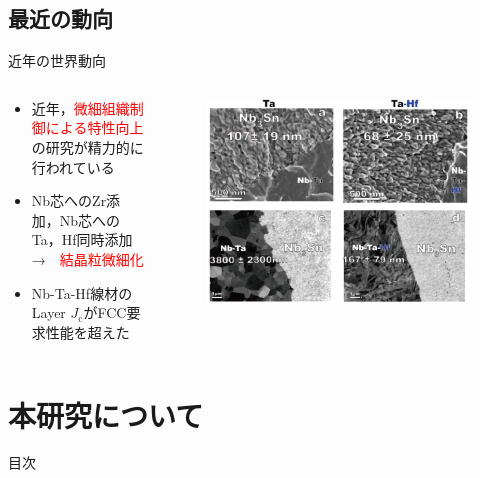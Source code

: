 \documentclass[aspectratio=169, unicode, 10pt]{beamer}
\begin{document}
	\subsection{最近の動向}
	\begin{frame}{近年の世界動向}
		\begin{columns}
			\begin{column}{0.65\linewidth}
				\begin{itemize}
					\item 近年，\textcolor{red}{微細組織制御による特性向上}の研究が精力的に行われている
					\item Nb芯へのZr添加，Nb芯へのTa，Hf同時添加　→　\textcolor{red}{結晶粒微細化}
					\item Nb-Ta-Hf線材のLayer $J_\mathrm{c}$がFCC要求性能を超えた
				\end{itemize}
			\end{column}
			\begin{column}{0.35\linewidth}
				\begin{figure}
					\centering
					\includegraphics[width=\linewidth]{figs/NbTaHf.jpg}
				\end{figure}
			\end{column}
		\end{columns}

		\vspace{20pt}
	\end{frame}

	\section{本研究について}
	\begin{frame}{目次}
	\end{frame}
\end{document}
